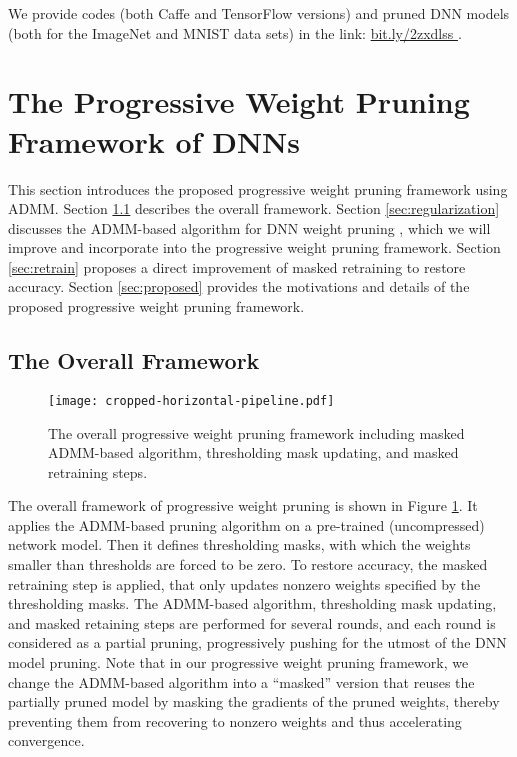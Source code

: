 \documentclass{article} %
\begin{document}
We provide codes (both Caffe and TensorFlow versions) and pruned DNN models (both for the ImageNet and MNIST data sets) in the link: \url{bit.ly/2zxdlss	}.


 


\section{The Progressive Weight Pruning Framework of DNNs}

This section introduces the proposed progressive weight pruning framework using ADMM. 
Section \ref{sec:overall} describes the overall framework. 
Section \ref{sec:regularization} discusses the ADMM-based algorithm for DNN weight pruning \citep{zhang2018systematic}, which we will improve and incorporate into the progressive weight pruning framework.
Section \ref{sec:retrain} proposes a direct improvement of masked retraining to restore accuracy.
Section \ref{sec:proposed} provides the motivations and details of the proposed progressive weight pruning framework.


\subsection{The Overall Framework}\label{sec:overall}

\begin{figure}[h]
\begin{center}
\texttt{[image: cropped-horizontal-pipeline.pdf]}
\end{center}
\caption{The overall progressive weight pruning framework including masked ADMM-based algorithm, thresholding mask updating, and masked retraining steps.}\label{fig:framework}
\end{figure}

The overall framework of progressive weight pruning is shown in Figure \ref{fig:framework}. 
It applies the ADMM-based pruning algorithm on a pre-trained (uncompressed) network model.
Then it defines thresholding masks, with which the weights smaller than thresholds are forced to be zero.
To restore accuracy, the masked retraining step is applied, that only updates nonzero weights specified by the thresholding masks.
The ADMM-based algorithm, thresholding mask updating, and masked retaining steps are performed for several rounds, and each round is considered as a partial pruning, progressively pushing for the utmost of the DNN model pruning. 
Note that in our progressive weight pruning framework, we change the ADMM-based algorithm into a ``masked'' version that reuses the partially pruned model by masking the gradients of the pruned weights, thereby preventing them from recovering to nonzero weights and thus accelerating convergence.
\end{document}
